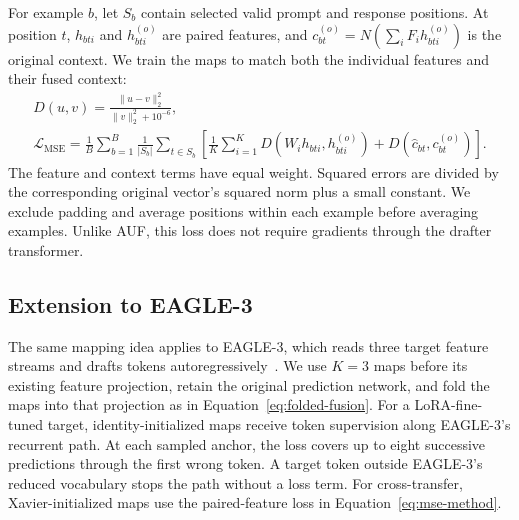 For example $b$, let $S_b$ contain selected valid prompt and response positions. At position $t$, $h_{bti}$ and $h^{(o)}_{bti}$ are paired features, and $c^{(o)}_{bt}=N(\sum_i F_i h^{(o)}_{bti})$ is the original context. We train the maps to match both the individual features and their fused context:
\begin{gather}
 D(u,v)=\frac{\lVert u-v\rVert_2^2}{\lVert v\rVert_2^2+10^{-6}},
 \label{eq:relative-error}\\
 \mathcal L_{\mathrm{MSE}}
 =\frac1B\sum_{b=1}^{B}\frac1{|S_b|}\sum_{t\in S_b}
 \left[\frac1K\sum_{i=1}^{K}D(W_i h_{bti},h^{(o)}_{bti})
 +D(\widehat c_{bt},c^{(o)}_{bt})\right].
 \label{eq:mse-method}
\end{gather}
The feature and context terms have equal weight. Squared errors are divided by the corresponding original vector's squared norm plus a small constant. We exclude padding and average positions within each example before averaging examples. Unlike AUF, this loss does not require gradients through the drafter transformer.

\subsection{Extension to EAGLE-3}
\label{sec:method-generation}
The same mapping idea applies to EAGLE-3, which reads three target feature streams and drafts tokens autoregressively~\citep{li2025eagle3}. We use $K=3$ maps before its existing feature projection, retain the original prediction network, and fold the maps into that projection as in Equation~\ref{eq:folded-fusion}. For a LoRA-fine-tuned target, identity-initialized maps receive token supervision along EAGLE-3's recurrent path. At each sampled anchor, the loss covers up to eight successive predictions through the first wrong token. A target token outside EAGLE-3's reduced vocabulary stops the path without a loss term. For cross-transfer, Xavier-initialized maps use the paired-feature loss in Equation~\ref{eq:mse-method}.
